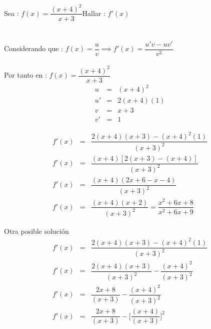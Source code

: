 \documentclass[10pt, a5paper]{article}
\begin{document}
Sea : \qquad\qquad$f(x) = \dfrac{(x + 4)^2}{x + 3}$\qquad Hallar : \qquad$f'(x)$ \\ \\

 \\
Considerando que : $f(x) = \dfrac{u}{v} \implies f'(x) = \dfrac{u'v - uv'}{v^2}$ \\ \\

Por tanto en : \qquad$f(x) = \dfrac{(x + 4)^2}{x + 3}$
\begin{eqnarray*}
u & = & (x + 4)^2 \\
u' & = & 2 (x + 4)(1) \\
v & = & x + 3 \\
v' & = & 1
\end{eqnarray*}

\begin{eqnarray*}
f'(x) &=& \dfrac{2(x + 4)(x + 3) - (x+4)^2 (1)}{(x+3)^2} \\
f'(x) &=& \dfrac{(x + 4)[2(x + 3) - (x + 4)]}{(x + 3)^2} \\
f'(x) &=& \dfrac{(x + 4)(2x + 6 - x - 4)}{(x + 3)^2} \\
f'(x) &=& \dfrac{(x + 4)(x + 2)}{(x +3)^2} = \dfrac{x^{2} + 6x + 8}{x^{2} + 6x + 9}
\end{eqnarray*}

{\scriptsize Otra posible solución}
\begin{eqnarray*}
f'(x) &=& \dfrac{2(x + 4)(x + 3) - (x+4)^2 (1)}{(x+3)^{2}} \\
f'(x) &=& \dfrac{2(x + 4)(x + 3)}{(x+3)^{2}} - \dfrac{(x+4)^{2}}{(x+3)^{2}} \\
f'(x) &=& \dfrac{2x + 8}{(x+3)} - \dfrac{(x+4)^{2}}{(x+3)^{2}} \\
f'(x) &=& \dfrac{2x + 8}{(x+3)} - \Bigg[\dfrac{(x+4)}{(x+3)}\Bigg]^{2} 
\end{eqnarray*}
\end{document}
